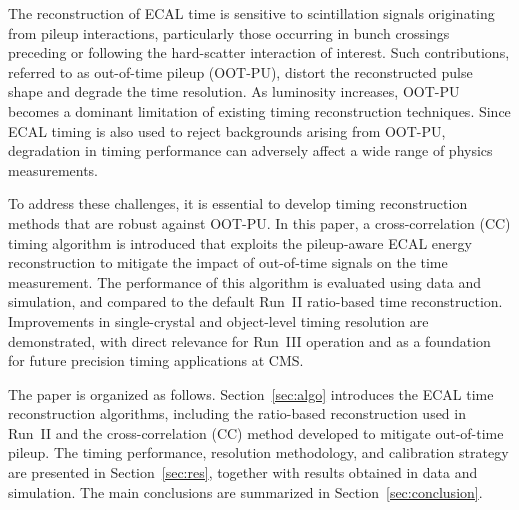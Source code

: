The reconstruction of ECAL time is sensitive to scintillation signals originating from pileup interactions, particularly those occurring in bunch crossings preceding or following the hard-scatter interaction of interest.
Such contributions, referred to as out-of-time pileup (OOT-PU), distort the reconstructed pulse shape and degrade the time resolution.
As luminosity increases, OOT-PU becomes a dominant limitation of existing timing reconstruction techniques.
Since ECAL timing is also used to reject backgrounds arising from OOT-PU, degradation in timing performance can adversely affect a wide range of physics measurements.

To address these challenges, it is essential to develop timing reconstruction methods that are robust against OOT-PU.
In this paper, a cross-correlation (CC) timing algorithm is introduced that exploits the pileup-aware ECAL energy reconstruction to mitigate the impact of out-of-time signals on the time measurement.
The performance of this algorithm is evaluated using data and simulation, and compared to the default Run~II ratio-based time reconstruction.
Improvements in single-crystal and object-level timing resolution are demonstrated, with direct relevance for Run~III operation and as a foundation for future precision timing applications at CMS.

The paper is organized as follows.
Section~\ref{sec:algo} introduces the ECAL time reconstruction algorithms, including the ratio-based reconstruction used in Run~II and the cross-correlation (CC) method developed to mitigate out-of-time pileup.
The timing performance, resolution methodology, and calibration strategy are presented in Section~\ref{sec:res}, together with results obtained in data and simulation.
The main conclusions are summarized in Section~\ref{sec:conclusion}.
